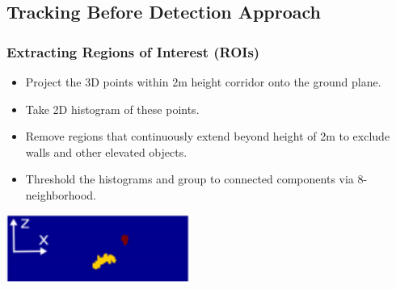 \documentclass{beamer}
\begin{document}
\subsection{Tracking Before Detection Approach}
\begin{frame}
\frametitle{Extracting Regions of Interest (ROIs)} 


  \begin{itemize}
  	\item Project the 3D points within 2m height corridor onto the ground plane.
  	\item Take 2D histogram of these points.
  	\item Remove regions that continuously extend beyond height of 2m to exclude walls and other elevated objects. 
  	\item Threshold the histograms and group to connected components via 8-neighborhood.
  \end{itemize}
\begin{center}
  \includegraphics[width=6cm]{histogram.pdf}
  \end{center}
\end{frame}


\end{document}
